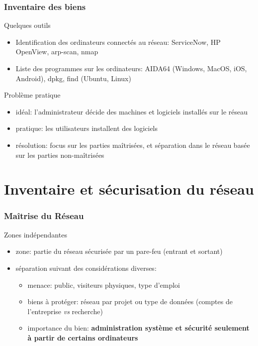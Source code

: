 \begin{reveals}
\begin{frame}
\end{frame}

\begin{frame}
  \frametitle{Inventaire des biens}

  \vfill

   \begin{block}{Quelques outils}
     \begin{itemize}
     \item Identification des ordinateurs connectés au réseau:
       ServiceNow, HP OpenView, arp-scan, nmap
     \item Liste des programmes sur les ordinateurs: AIDA64 (Windows,
       MacOS, iOS, Android), dpkg, find (Ubuntu, Linux)
     \end{itemize}
  \end{block}

  \vfill
\begin{block}{Problème pratique}
  \begin{itemize}
  \item idéal: l'administrateur décide des machines et logiciels installés sur le réseau
  \item pratique: les utilisateurs installent des logiciels 
  \item résolution: focus sur les parties maîtrisées, et séparation dans le réseau
    basée sur les parties non-maîtrisées
  \end{itemize}
  \end{block}

  \vfill
\end{frame}

\section{Inventaire et sécurisation du réseau}


\begin{frame}
  \frametitle{Maîtrise du Réseau}

  \vfill

   \begin{block}{Zones indépendantes}
     \begin{itemize}
     \item zone: partie du réseau sécurisée par un pare-feu (entrant et sortant)
     \item séparation suivant des considérations diverses:
       \begin{itemize}
       \item menace: public, visiteurs physiques, type d'emploi
       \item biens à protéger: réseau par projet ou type de données
         (comptes de l'entreprise \textit{vs} recherche)
       \item importance du bien: \textbf{administration système et
           sécurité seulement à partir de certains ordinateurs}
       \end{itemize}
     \end{itemize}
  \end{block}


\end{frame}
\end{reveals}

